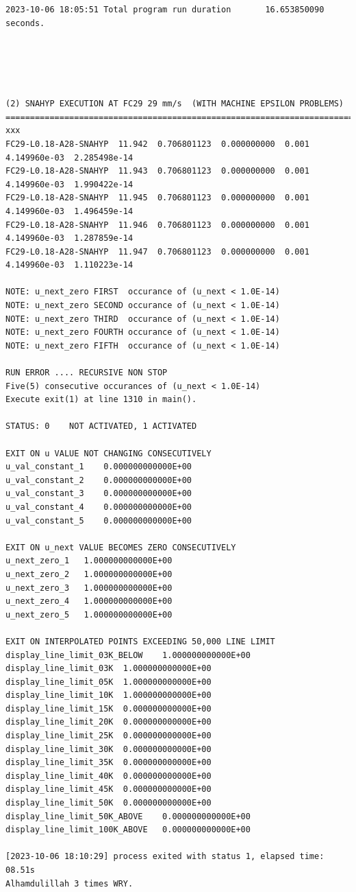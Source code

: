 \begin{landscape}
\begin{lstlisting}[caption={SnaHyp Machine Epsilon Problems}, label=lst-SnaHyp Machine Epsilon Problems]
2023-10-06 18:05:51	Total program run duration   	 16.653850090 seconds. 





(2) SNAHYP EXECUTION AT FC29 29 mm/s  (WITH MACHINE EPSILON PROBLEMS)
===========================================================================================
xxx
FC29-L0.18-A28-SNAHYP  11.942  0.706801123  0.000000000  0.001 4.149960e-03  2.285498e-14     
FC29-L0.18-A28-SNAHYP  11.943  0.706801123  0.000000000  0.001 4.149960e-03  1.990422e-14 
FC29-L0.18-A28-SNAHYP  11.945  0.706801123  0.000000000  0.001 4.149960e-03  1.496459e-14     
FC29-L0.18-A28-SNAHYP  11.946  0.706801123  0.000000000  0.001 4.149960e-03  1.287859e-14     
FC29-L0.18-A28-SNAHYP  11.947  0.706801123  0.000000000  0.001 4.149960e-03  1.110223e-14     	

NOTE: u_next_zero FIRST  occurance of (u_next < 1.0E-14)	
NOTE: u_next_zero SECOND occurance of (u_next < 1.0E-14)	
NOTE: u_next_zero THIRD  occurance of (u_next < 1.0E-14)	
NOTE: u_next_zero FOURTH occurance of (u_next < 1.0E-14)	
NOTE: u_next_zero FIFTH  occurance of (u_next < 1.0E-14)	

RUN ERROR .... RECURSIVE NON STOP 	
Five(5) consecutive occurances of (u_next < 1.0E-14) 	
Execute exit(1) at line 1310 in main(). 	

STATUS: 0 	 NOT ACTIVATED, 1 ACTIVATED 

EXIT ON u VALUE NOT CHANGING CONSECUTIVELY	
u_val_constant_1 	0.000000000000E+00
u_val_constant_2 	0.000000000000E+00
u_val_constant_3 	0.000000000000E+00
u_val_constant_4 	0.000000000000E+00
u_val_constant_5 	0.000000000000E+00

EXIT ON u_next VALUE BECOMES ZERO CONSECUTIVELY	
u_next_zero_1 	1.000000000000E+00
u_next_zero_2 	1.000000000000E+00
u_next_zero_3 	1.000000000000E+00
u_next_zero_4 	1.000000000000E+00
u_next_zero_5 	1.000000000000E+00

EXIT ON INTERPOLATED POINTS EXCEEDING 50,000 LINE LIMIT	
display_line_limit_03K_BELOW 	1.000000000000E+00
display_line_limit_03K 	1.000000000000E+00
display_line_limit_05K 	1.000000000000E+00
display_line_limit_10K 	1.000000000000E+00
display_line_limit_15K 	0.000000000000E+00
display_line_limit_20K 	0.000000000000E+00
display_line_limit_25K 	0.000000000000E+00
display_line_limit_30K 	0.000000000000E+00
display_line_limit_35K 	0.000000000000E+00
display_line_limit_40K 	0.000000000000E+00
display_line_limit_45K 	0.000000000000E+00
display_line_limit_50K 	0.000000000000E+00
display_line_limit_50K_ABOVE 	0.000000000000E+00
display_line_limit_100K_ABOVE 	0.000000000000E+00

[2023-10-06 18:10:29] process exited with status 1, elapsed time: 08.51s	
Alhamdulillah 3 times WRY.

\end{lstlisting}
\end{landscape}   



